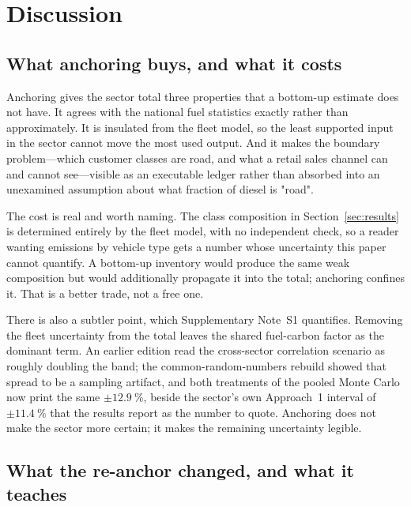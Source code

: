 \section{Discussion}
\label{sec:discussion}

\subsection{What anchoring buys, and what it costs}

Anchoring gives the sector total three properties that a bottom-up estimate does not have. It
agrees with the national fuel statistics exactly rather than approximately. It is insulated
from the fleet model, so the least supported input in the sector cannot move the most used
output. And it makes the boundary problem---which customer classes are road, and what a
retail sales channel can and cannot see---visible as an executable ledger rather than
absorbed into an unexamined assumption about what fraction of diesel is "road".

The cost is real and worth naming. The class composition in Section~\ref{sec:results} is
determined entirely by the fleet model, with no independent check, so a reader wanting
emissions by vehicle type gets a number whose uncertainty this paper cannot quantify. A
bottom-up inventory would produce the same weak composition but would additionally propagate
it into the total; anchoring confines it. That is a better trade, not a free one.

There is also a subtler point, which Supplementary Note~S1 quantifies. Removing the fleet
uncertainty from the total leaves the shared fuel-carbon factor as the dominant term. An
earlier edition read the cross-sector correlation scenario as roughly doubling the band;
the common-random-numbers rebuild showed that spread to be a sampling artifact, and both
treatments of the pooled Monte Carlo now print the same $\pm\SI{12.9}{\percent}$, beside the
sector's own Approach~1 interval of $\pm\SI{11.4}{\percent}$ that the results report as the
number to quote. Anchoring does not make the
sector more certain; it makes the remaining uncertainty legible.

\subsection{What the re-anchor changed, and what it teaches}

